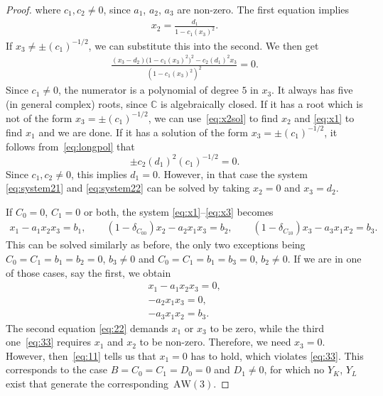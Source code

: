 \documentclass[pdftex]{sigma}
\numberwithin{equation}{section}
\newcommand{\CC}{\mathbb{C}}
\newcommand{\aw}{\mathrm{AW}\!\left(3\right)}
\begin{document}
\begin{proof}
	where $c_1,c_2\neq0$, since $a_1$, $a_2$, $a_3$ are non-zero.
	The first equation implies
	\begin{gather}
		x_2=\frac{d_1}{1-c_1(x_3)^2}.\label{eq:x2sol}
	\end{gather}
	If $x_3\neq \pm (c_1)^{-1/2}$, we can substitute this into the second. We then get
	\begin{gather}
		\frac{(x_3-d_2)\big(1-c_1(x_3)^2\big)^2-c_2(d_1)^2x_3}{(1-c_1(x_3)^2)^2}=0.\label{eq:longpol}
	\end{gather}
	Since $c_1\neq 0$, the numerator is a polynomial of degree $5$ in $x_3$. It always has five (in general complex) roots, since $\CC$ is algebraically closed. If it has a root which is not of the form $x_3= \pm (c_1)^{-1/2}$, we can use~\eqref{eq:x2sol} to find $x_2$ and \eqref{eq:x1} to find $x_1$ and we are done. If it has a solution of the form $x_3= \pm (c_1)^{-1/2}$, it follows from~\eqref{eq:longpol} that
	\[
	\pm c_2(d_1)^2(c_1)^{-1/2}=0.
	\]
Since $c_1,c_2\neq0$, this implies $d_1=0$.
However, in that case the system \eqref{eq:system21} and \eqref{eq:system22} can be solved by taking $x_2=0$ and $x_3=d_2$.

	If $C_0=0$, $C_1=0$ or both, the system \eqref{eq:x1}--\eqref{eq:x3} becomes
	\begin{gather*}
		x_1-a_1x_2x_3=b_1,\qquad
		(1-\delta_{C_00})x_2-a_2x_1x_3=b_2,\qquad
		(1-\delta_{C_10})x_3-a_3x_1x_2=b_3.
	\end{gather*}
	This can be solved similarly as before, the only two exceptions being $C_0=C_1=b_1=b_2=0$, $b_3\neq0$ and $C_0=C_1=b_1=b_3=0$, $b_2\neq0$. If we are in one of those cases, say the first, we obtain
	\begin{gather}
		x_1-a_1x_2x_3=0,\label{eq:11}\\
		-a_2x_1x_3=0,\label{eq:22}\\
		-a_3x_1x_2=b_3.\label{eq:33}
	\end{gather}
	The second equation \eqref{eq:22} demands $x_1$ or $x_3$ to be zero, while the third one~\eqref{eq:33} requires $x_1$ and $x_2$ to be non-zero. Therefore, we need $x_3=0$. However, then~\eqref{eq:11} tells us that $x_1=0$ has to hold, which violates \eqref{eq:33}. This corresponds to the case $B=C_0=C_1=D_0=0$ and $D_1\neq 0$, for which no $Y_K$, $Y_L$ exist that generate the corresponding~$\aw$.
\end{proof}
\end{document}
